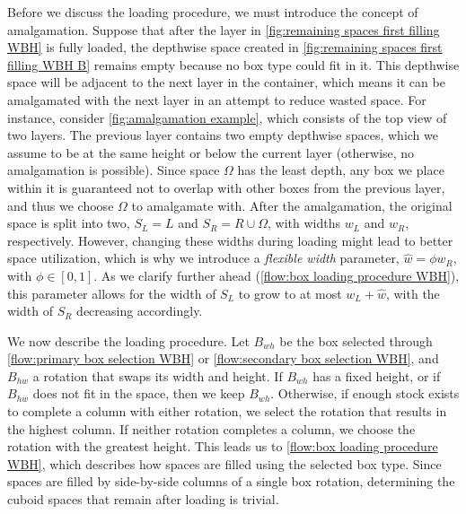 



Before we discuss the loading procedure, we must introduce the concept of amalgamation. Suppose that after the layer in \cref{fig:remaining spaces first filling WBH} is fully loaded, the depthwise space created in \cref{fig:remaining spaces first filling WBH B} remains empty because no box type could fit in it. This depthwise space will be adjacent to the next layer in the container, which means it can be amalgamated with the next layer in an attempt to reduce wasted space. For instance, consider \cref{fig:amalgamation example}, which consists of the top view of two layers. The previous layer contains two empty depthwise spaces, which we assume to be at the same height or below the current layer (otherwise, no amalgamation is possible). Since space $\Omega$ has the least depth, any box we place within it is guaranteed not to overlap with other boxes from the previous layer, and thus we choose $\Omega$ to amalgamate with. After the amalgamation, the original space is split into two, $S_{L} = L$ and $S_{R} = R \cup \Omega$, with widths $w_L$ and $w_R$, respectively. However, changing these widths during loading might lead to better space utilization, which is why we introduce a \emph{flexible width} parameter, $\hat{w} = \phi w_{R}$, with $\phi \in [0,1]$. As we clarify further ahead (\cref{flow:box loading procedure WBH}), this parameter allows for the width of $S_L$ to grow to at most $w_L + \hat{w}$, with the width of $S_R$ decreasing accordingly.



We now describe the loading procedure. Let $B_{wh}$ be the box selected through \cref{flow:primary box selection WBH} or \cref{flow:secondary box selection WBH}, and $B_{hw}$ a rotation that swaps its width and height. If $B_{wh}$ has a fixed height, or if $B_{hw}$ does not fit in the space, then we keep $B_{wh}$. Otherwise, if enough stock exists to complete a column with either rotation, we select the rotation that results in the highest column. If neither rotation completes a column, we choose the rotation with the greatest height. This leads us to \cref{flow:box loading procedure WBH}, which describes how spaces are filled using the selected box type. Since spaces are filled by side-by-side columns of a single box rotation, determining the cuboid spaces that remain after loading is trivial.



